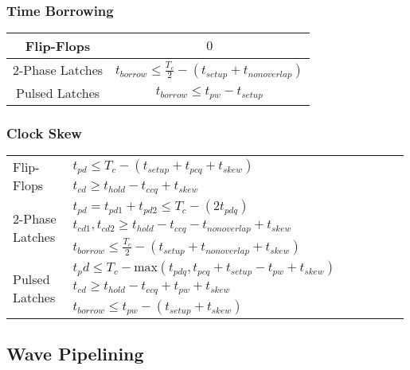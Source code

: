 \documentclass{formulae}
\begin{document}
\begin{multicols*}{2}
            \subsubsection{Time Borrowing}
            \begin{tabular}{| c | c |}
                \hline
                Flip-Flops & $0$ \\
                \hline
                2-Phase Latches & $t_{borrow} \leq \frac{T_c}{2} - (t_{setup} + t_{nonoverlap})$ \\
                \hline
                Pulsed Latches & $t_{borrow} \leq t_{pw} - t_{setup}$ \\
                \hline
            \end{tabular}

            \subsubsection{Clock Skew}
            \begin{tabular}{| p{0.15\linewidth} | p{0.84\linewidth} |}
                \hline
                \multirow{2}{4em}{Flip-Flops} & $t_{pd} \leq T_c - (t_{setup} + t_{pcq} + t_{skew})$ \\
                & $t_{cd} \geq t_{hold} - t_{ccq} + t_{skew}$\\
                \hline
                \multirow{3}{4em}{2-Phase Latches} & $t_{pd} = t_{pd1} + t_{pd2} \leq T_c - (2t_{pdq})$ \\
                & $t_{cd1},t_{cd2} \geq t_{hold} - t_{ccq} - t_{nonoverlap} + t_{skew}$\\
                & $t_{borrow} \leq \frac{T_c}{2} - (t_{setup} + t_{nonoverlap} + t_{skew})$\\
                \hline
                \multirow{3}{4em}{Pulsed Latches} & $t_pd \leq T_c - \text{max}\left( t_{pdq}, t_{pcq} + t_{setup} - t_{pw} + t_{skew}\right)$ \\
                & $t_{cd} \geq t_{hold} - t_{ccq} + t_{pw} + t_{skew}$ \\
                & $t_{borrow} \leq t_{pw} - (t_{setup} +t_{skew})$\\
                \hline
            \end{tabular}
        \subsection{Wave Pipelining}

\end{multicols*}
\end{document}
